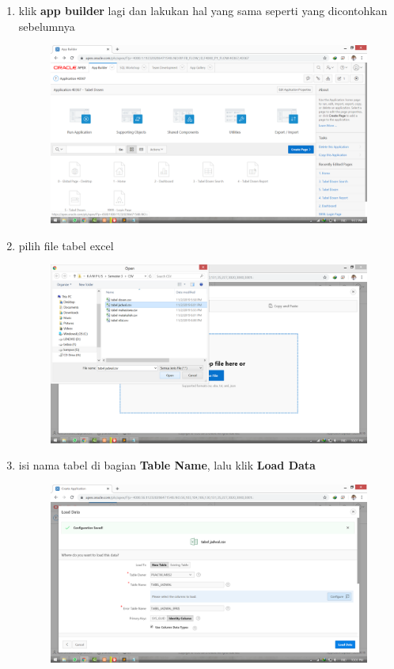 \documentclass[11pt]{article}
\begin{document}
\begin{enumerate}
\newpage
\item klik \textbf{app builder} lagi dan lakukan hal yang sama seperti yang dicontohkan sebelumnya
	\begin{figure}[h]
        \centerline{\includegraphics[scale=0.1]{img/12.png}}
        \centering
        \caption{}
		\label{langkah18}
	\end{figure}
	
\item pilih file tabel excel
	\begin{figure}[h]
        \centerline{\includegraphics[scale=0.1]{img/13.png}}
        \centering
        \caption{}
		\label{langkah19}
	\end{figure}
	
\newpage
\item isi nama tabel di bagian \textbf{Table Name}, lalu klik \textbf{Load Data}
	\begin{figure}[h]
        \centerline{\includegraphics[scale=0.1]{img/14.png}}
        \centering
        \caption{}
		\label{langkah20}
	\end{figure}
	

\end{enumerate}
\end{document}
